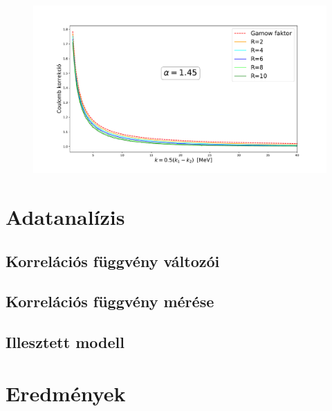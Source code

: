\documentclass[10pt,a4paper]{article}
\numberwithin{equation}{subsection}
\numberwithin{figure}{section}
\begin{document}
\begin{figure}[H]
\centering
\includegraphics[scale=0.45]{pic/Coulomb/C2_dR_a145.pdf}
\end{figure}

\section{Adatanalízis}
\subsection{Korrelációs függvény változói}
\subsection{Korrelációs függvény mérése}
\subsection{Illesztett modell}

\section{Eredmények}
\end{document}

